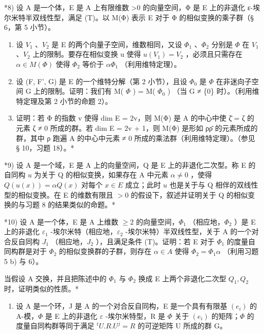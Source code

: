 *8) 设 A 是一个体，E 是 A 上有限维数 \textgreater0 的向量空间，Φ 是 E 上的非退化 ε-埃尔米特半双线性型，满足 (T)。以 M(Φ) 表示 E 对于 Φ 的相似变换的乘子群（§ 6，第 5 小节）。

\begin{enumerate}
\def\labelenumi{\alph{enumi})}
\item
  设 \(V_{1}\) 、\(V_{2}\) 是 E 的两个向量子空间，维数相同，又设 \(\Phi_{1}\) 、\(\Phi_{2}\) 分别是 \(\Phi\) 在 \(V_{1}\) 、\(V_{2}\) 上的限制。要存在相似变换 u 使得 \(u(V_{1}) = V_{2}\) ，必须且只需存在 \(\alpha \in M(\Phi)\) 使得 \(\Phi_{2}\) 等价于 \(\alpha\Phi_{1}\) （利用维特定理）。
\item
  设 (F, F', G) 是 E 的一个维特分解（第 2 小节），且设 \(\Phi_0\) 是 \(\Phi\) 在非迷向子空间 G 上的限制。证明：我们有 M( \(\Phi\) ) = M( \(\Phi_0\) ) （当 G ≠ \{0\} 时）。（利用维特定理及第 2 小节的命题 2）。
\item
  证明：若 Φ 的指数 v 使得 dim E = 2v，则 M(Φ) 是 A 的中心中使 ζ̄ = ζ 的元素 ζ ≠ 0 所成的群。若 dim E = 2v + 1，则 M(Φ) 是形如 ρρ̄ 的元素所成的群，其中 ρ 跑遍 A 的中心中元素 ≠ 0 所成的乘法群（利用维特定理）。（参见 § 10，习题 18）。*
\end{enumerate}

*9) 设 A 是一个域，E 是 A 上的向量空间，Q 是 E 上的非退化二次型。称 E 的自同构 \(u\) 为关于 Q 的相似变换，如果存在 A 中元素 \(\alpha \neq 0\) ，使得 \(Q(u(x)) = \alpha Q(x)\) 对每个 \(x \in E\) 成立；此时 \(u\) 也是关于与 Q 相伴的双线性型的相似变换。在 E 的维数有限且 \(>0\) 的假设下，叙述并证明关于 Q 的相似变换的与习题 8 的结果类似的命题。*

*10) 设 A 是一个体，E 是 A 上维数 \(\geqslant 2\) 的向量空间，\(\Phi_1\) （相应地，\(\Phi_2\) ）是 E 上的非退化 \(\varepsilon_1\) -埃尔米特（相应地，\(\varepsilon_2\) -埃尔米特）半双线性型，关于 A 的一个对合反自同构 \(J_1\) （相应地，\(J_2\) ），且满足条件 (T)。证明：若 E 对于 \(\Phi_1\) 的度量自同构群是对于 \(\Phi_2\) 的相似变换群的子群，则存在 \(\alpha \in A\) 使得 \(\Phi_2 = \Phi_1\alpha\) （利用习题 5 b) 与 6）。

当假设 A 交换，并且把陈述中的 \(\Phi_{1}\) 与 \(\Phi_{2}\) 换成 E 上两个非退化二次型 \(Q_{1}, Q_{2}\) 时，证明类似的性质。*

\begin{enumerate}
\def\labelenumi{\arabic{enumi})}
\setcounter{enumi}{10}
\tightlist
\item
  设 A 是一个环，J 是 A 的一个对合反自同构，E 是一个具有有限基 \((e_{i})\) 的 A-模，\(\Phi\) 是 E 上的非退化 \(\varepsilon\) -埃尔米特型，R 是 \(\Phi\) 关于 \((e_{i})\) 的矩阵；\(\Phi\) 的度量自同构群等同于满足 \(^{t}U.R.U^{j}=R\) 的可逆矩阵 U 所成的群 G。
\end{enumerate}

